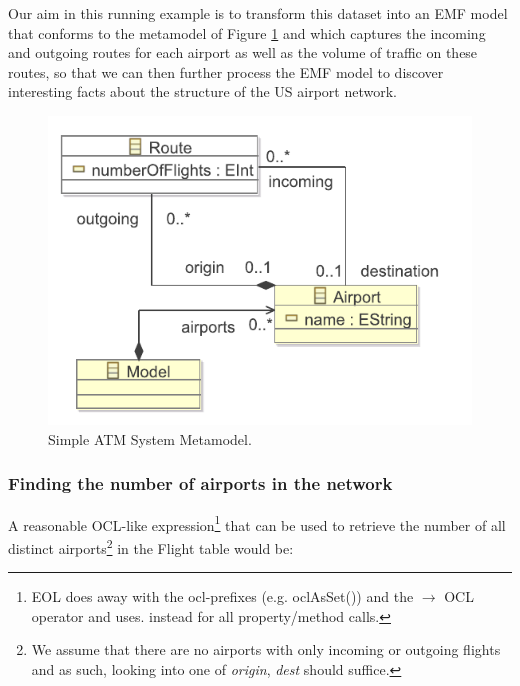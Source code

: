 Our aim in this running example is to transform this dataset into an EMF model that conforms to the metamodel of Figure \ref{fig:atms} and which captures the incoming and outgoing routes for each airport as well as the volume of traffic on these routes, so that we can then further process the EMF model to discover interesting facts about the structure of the US airport network.

\begin{figure}[ht]
	\centering
	\includegraphics[width=.8\textwidth]{images/atms.pdf}
	\caption{Simple ATM System Metamodel.}
	\label{fig:atms}
\end{figure}

%

\subsubsection{Finding the number of airports in the network}

A reasonable OCL-like expression\footnote{EOL does away with the ocl-prefixes (e.g. oclAsSet()) and the $\rightarrow$ OCL operator and uses. instead for all property/method calls.} that can be used to retrieve the number of all distinct airports\footnote{We assume that there are no airports with only incoming or outgoing flights and as such, looking into one of \emph{origin}, \emph{dest} should suffice.} in the Flight table would be:

